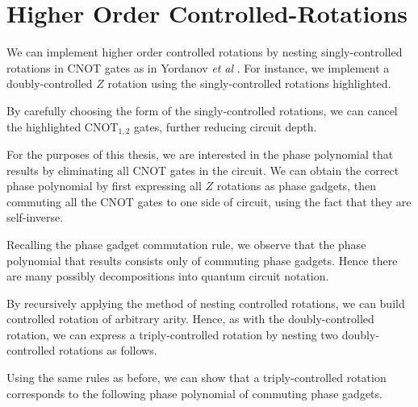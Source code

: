 \section{Higher Order Controlled-Rotations}

We can implement higher order controlled rotations by nesting singly-controlled rotations in CNOT gates as in Yordanov \textit{et al} \cite{Yordanov2020}. For instance, we implement a doubly-controlled $Z$ rotation using the singly-controlled rotations highlighted.


By carefully choosing the form of the singly-controlled rotations, we can cancel the highlighted $\text{CNOT}_{1, 2}$ gates, further reducing circuit depth.


For the purposes of this thesis, we are interested in the phase polynomial that results by eliminating all CNOT gates in the circuit. We can obtain the correct phase polynomial by first expressing all $Z$ rotations as phase gadgets, then commuting all the CNOT gates to one side of circuit, using the fact that they are self-inverse.


Recalling the phase gadget commutation rule, we observe that the phase polynomial that results consists only of commuting phase gadgets. Hence there are many possibly decompositions into quantum circuit notation.

By recursively applying the method of nesting controlled rotations, we can build controlled rotation of arbitrary arity. Hence, as with the doubly-controlled rotation, we can express a triply-controlled rotation by nesting two doubly-controlled rotations as follows.


Using the same rules as before, we can show that a triply-controlled rotation corresponds to the following phase polynomial of commuting phase gadgets.

